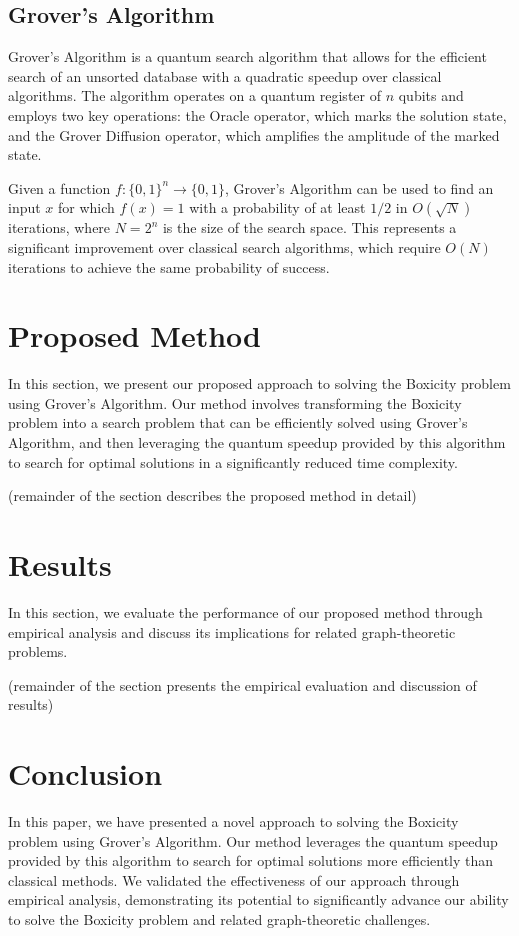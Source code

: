 \subsection{Grover's Algorithm}
Grover's Algorithm is a quantum search algorithm that allows for the efficient search of an unsorted database with a quadratic speedup over classical algorithms. The algorithm operates on a quantum register of $n$ qubits and employs two key operations: the Oracle operator, which marks the solution state, and the Grover Diffusion operator, which amplifies the amplitude of the marked state.

Given a function $f : \{0, 1\}^n \rightarrow \{0, 1\}$, Grover's Algorithm can be used to find an input $x$ for which $f(x)=1$ with a probability of at least $1/2$ in $O(\sqrt{N})$ iterations, where $N=2^n$ is the size of the search space. This represents a significant improvement over classical search algorithms, which require $O(N)$ iterations to achieve the same probability of success.

\section{Proposed Method} \label{sec:method}
In this section, we present our proposed approach to solving the Boxicity problem using Grover's Algorithm. Our method involves transforming the Boxicity problem into a search problem that can be efficiently solved using Grover's Algorithm, and then leveraging the quantum speedup provided by this algorithm to search for optimal solutions in a significantly reduced time complexity.

(remainder of the section describes the proposed method in detail)

\section{Results} \label{sec:results}
In this section, we evaluate the performance of our proposed method through empirical analysis and discuss its implications for related graph-theoretic problems.

(remainder of the section presents the empirical evaluation and discussion of results)

\section{Conclusion} \label{sec:conclusion}
In this paper, we have presented a novel approach to solving the Boxicity problem using Grover's Algorithm. Our method leverages the quantum speedup provided by this algorithm to search for optimal solutions more efficiently than classical methods. We validated the effectiveness of our approach through empirical analysis, demonstrating its potential to significantly advance our ability to solve the Boxicity problem and related graph-theoretic challenges.

